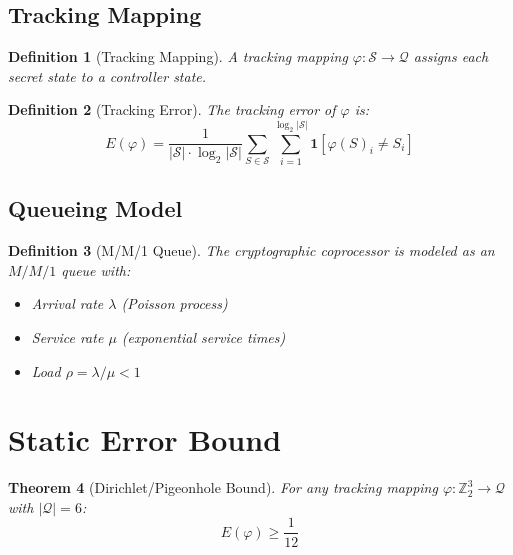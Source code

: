 \documentclass[11pt]{article}
\newtheorem{theorem}{Theorem}[section]
\newtheorem{definition}[theorem]{Definition}
\begin{document}
\subsection{Tracking Mapping}

\begin{definition}[Tracking Mapping]
A tracking mapping $\varphi: \mathcal{S} \to \mathcal{Q}$ assigns each secret state to a controller state.
\end{definition}

\begin{definition}[Tracking Error]
The tracking error of $\varphi$ is:
$$E(\varphi) = \frac{1}{|\mathcal{S}| \cdot \log_2|\mathcal{S}|} \sum_{S \in \mathcal{S}} \sum_{i=1}^{\log_2|\mathcal{S}|} \mathbf{1}[\varphi(S)_i \neq S_i]$$
\end{definition}

\subsection{Queueing Model}

\begin{definition}[M/M/1 Queue]
The cryptographic coprocessor is modeled as an $M/M/1$ queue with:
\begin{itemize}
    \item Arrival rate $\lambda$ (Poisson process)
    \item Service rate $\mu$ (exponential service times)
    \item Load $\rho = \lambda/\mu < 1$
\end{itemize}
\end{definition}

\section{Static Error Bound}
\label{sec:static}

\begin{theorem}[Dirichlet/Pigeonhole Bound]
\label{thm:static}
For any tracking mapping $\varphi: \mathbb{Z}_2^3 \to \mathcal{Q}$ with $|\mathcal{Q}| = 6$:
$$E(\varphi) \geq \frac{1}{12}$$
\end{theorem}
\end{document}

